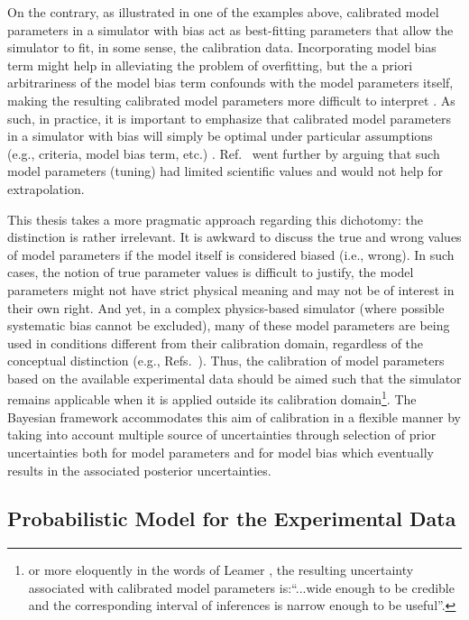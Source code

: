 On the contrary, as illustrated in one of the examples above, calibrated model parameters in a simulator with bias act as best-fitting parameters that allow the simulator to fit, in some sense, the calibration data.
Incorporating model bias term might help in alleviating the problem of overfitting, but the a priori arbitrariness of the model bias term confounds with the model parameters itself, making the resulting calibrated model parameters more difficult to interpret \cite{Higdon2004}.
As such, in practice, it is important to emphasize that calibrated model parameters in a simulator with bias will simply be optimal under particular assumptions (e.g., criteria, model bias term, etc.) \cite{Campbell2006}.
Ref.~\cite{Brynjarsdottir2014} went further by arguing that such model parameters (tuning) had limited scientific values and would not help for extrapolation.

This thesis takes a more pragmatic approach regarding this dichotomy: the distinction is rather irrelevant.
It is awkward to discuss the true and wrong values of model parameters if the model itself is considered biased (i.e., wrong).
In such cases, the notion of true parameter values is difficult to justify, the model parameters might not have strict physical meaning and may not be of interest in their own right.
And yet, in a complex physics-based simulator (where possible systematic bias cannot be excluded), many of these model parameters are being used in conditions different from their calibration domain, regardless of the conceptual distinction (e.g., Refs.~\cite{Arendt2012,USNRC2012}).
Thus, the calibration of model parameters based on the available experimental data should be aimed such that the simulator remains applicable when it is applied outside its calibration domain\footnote{or more eloquently in the words of Leamer \cite{Saltelli2006}, the resulting uncertainty associated with calibrated model parameters is:``...wide enough to be credible and the corresponding interval of inferences is narrow enough to be useful''.}.
The Bayesian framework accommodates this aim of calibration in a flexible manner by taking into account multiple source of uncertainties through selection of prior uncertainties both for model parameters and for model bias which eventually results in the associated posterior uncertainties.

\subsection{Probabilistic Model for the Experimental Data}\label{sub:bc_modular_data}

